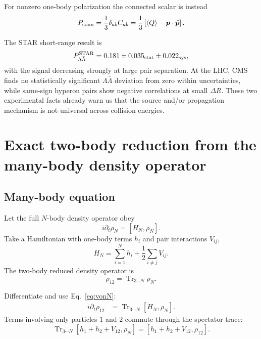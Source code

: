 \documentclass[11pt]{article}
\newcommand{\Trc}{\operatorname{Tr}}
\begin{document}
For nonzero one-body polarization the connected scalar is instead
\begin{equation}
P_{\rm conn}
=\frac13\delta_{ab}C_{ab}
=\frac13\left[
\langle Q\rangle-\bm p\cdot\bar{\bm p}
\right].
\end{equation}

The STAR short-range result is
\begin{equation}
P_{\Lambda\bar\Lambda}^{\rm STAR}
=0.181\pm0.035_{\rm stat}\pm0.022_{\rm sys},
\label{eq:STARnum}
\end{equation}
with the signal decreasing strongly at large pair separation. At the LHC, CMS finds no statistically significant $\Lambda\bar\Lambda$ deviation from zero within uncertainties, while same-sign hyperon pairs show negative correlations at small $\Delta R$. These two experimental facts already warn us that the source and/or propagation mechanism is not universal across collision energies.

\section{Exact two-body reduction from the many-body density operator}

\subsection{Many-body equation}

Let the full $N$-body density operator obey
\begin{equation}
i\partial_t\rho_N=[H_N,\rho_N].
\label{eq:vonN}
\end{equation}
Take a Hamiltonian with one-body terms $h_i$ and pair interactions $V_{ij}$,
\begin{equation}
H_N=\sum_{i=1}^{N}h_i+\frac12\sum_{i\neq j}V_{ij}.
\end{equation}
The two-body reduced density operator is
\begin{equation}
\rho_{12}
=\Trc_{3\cdots N}\rho_N.
\end{equation}

Differentiate and use Eq.~\eqref{eq:vonN}:
\begin{align}
i\partial_t\rho_{12}
&=\Trc_{3\cdots N}[H_N,\rho_N].
\end{align}
Terms involving only particles $1$ and $2$ commute through the spectator trace:
\begin{equation}
\Trc_{3\cdots N}[h_1+h_2+V_{12},\rho_N]
=[h_1+h_2+V_{12},\rho_{12}].
\end{equation}
\end{document}
